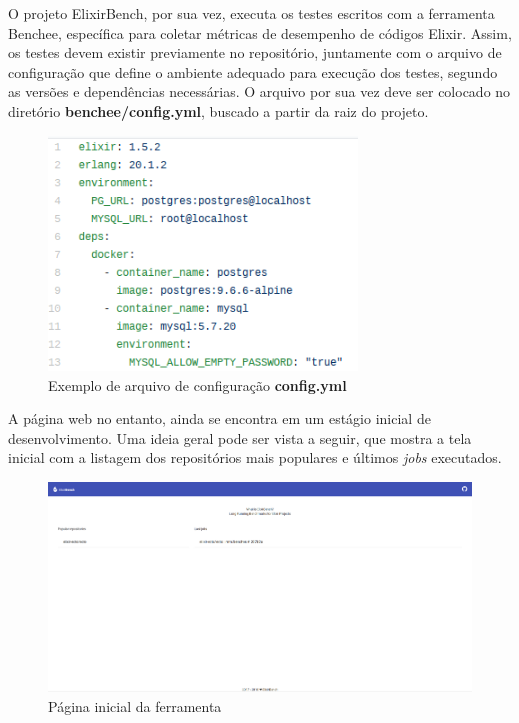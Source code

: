  O projeto ElixirBench, por sua vez, executa os testes escritos com a ferramenta
 Benchee, específica para coletar métricas de desempenho de códigos Elixir. Assim,
 os testes devem existir previamente no repositório, juntamente com o arquivo
 de configuração que define o ambiente adequado para execução dos testes, segundo
 as versões e dependências necessárias. O arquivo por sua vez deve ser colocado
 no diretório \textbf{benchee/config.yml}, buscado a partir da raiz do projeto.

\begin{figure}[!htb]
  \caption{Exemplo de arquivo de configuração \textbf{config.yml}}
  \centering
  \includegraphics[width=82mm]{figuras/config-yml.png}
\end{figure}

A página web no entanto, ainda se encontra em um estágio inicial de desenvolvimento.
Uma ideia geral pode ser vista a seguir, que mostra a tela inicial com a listagem
dos repositórios mais populares e últimos \textit{jobs} executados.

\begin{figure}[!htb]
  \caption{Página inicial da ferramenta}
  \centering
  \includegraphics[width=\linewidth]{figuras/homepage.png}
\end{figure}

